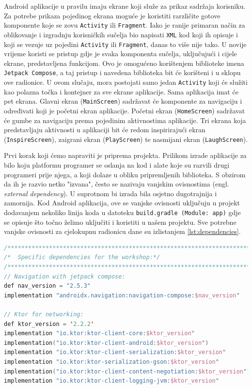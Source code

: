 \documentclass[11pt,a4paper,twoside]{article}
\begin{document}
Android aplikacije u pravilu imaju ekrane koji služe za prikaz sadržaja korisniku. Za potrebe prikaza pojedinog ekrana moguće je koristiti rarzličite gotove komponente koje se zovu \texttt{Activity} ili \texttt{Fragment}. Iako je ranije primaran način za oblikovanje i izgradnju korisničkih sučelja bio napisati \texttt{XML} kod koji ih opisuje i koji se vezuje uz pojedini \texttt{Activity} ili \texttt{Fragment}, danas to više nije tako. U novije vrijeme koristi se pristup gdje je svaka komponenta sučelja, uključujući i cijele ekrane, predstavljena funkcijom. Ovo je omogućeno korištenjem biblioteke imena \texttt{Jetpack Compose}, a taj pristup i navedena biblioteka bit će korišteni i u sklopu ove radionice. U ovom slučaju, mora postojati samo jedan \texttt{Activity} koji će služiti kao polazna točka i kontejner za sve ekrane aplikacije. Sama aplikacija imat će pet ekrana. Glavni ekran (\texttt{MainScreen}) sadržavat će komponente za navigaciju i određivati koji je početni ekran aplikacije. Početni ekran (\texttt{HomeScreen}) sadržavat će gumbe za navigaciju prema pojedinim aktivnostima aplikacije. Tri ekrana koja predstavljaju aktivnosti u aplikaciji bit će redom inspirirajući ekran (\texttt{InspireScreen}), zaigrani ekran (\texttt{PlayScreen}) te nasmijani ekran (\texttt{LaughScreen}). 

Prvi korak koji ćemo napraviti je priprema projekta. Prilikom izrade aplikacije za bilo koju platformu programer se oslanja na kod i alate koje su razvili drugi programeri prije njega, a koji dolaze u obliku pripremljenih biblioteka. S obzirom da ih je razvio netko "izvana", često se nazivaju vanjskim ovisnostima (engl. \textit{external dependency}). U suprotnom bi izrada bila osjetno dugotrajnija i zamornija. Kod Android aplikacija, ove se vanjske ovisnosti uključuju u projekt dodavanjem nekoliko linija koda u datoteku \texttt{build.gradle (Module: app)} gdje se opisuje što točno želimo uključiti i koristiti u našem projektu. Sve potrebne vanjske ovisnosti za cjelokupnu radionicu dane su izlistanjem \ref{lst:dependencies}.

\begin{lstlisting}[caption={Ovisnosnosti o vanjskim bibliotekama u datoteci build.gradle (Module:app)}, label={lst:dependencies}, language=Kotlin]
/***********************************************************************/
/*  Specific dependencies for the workshop:*/
/***********************************************************************/
// Navigation with jetpack compose:
def nav_version = "2.5.3"
implementation "androidx.navigation:navigation-compose:$nav_version"

// Ktor for networking:
def ktor_version = '2.2.2'
implementation "io.ktor:ktor-client-core:$ktor_version"
implementation("io.ktor:ktor-client-android:$ktor_version")
implementation "io.ktor:ktor-client-serialization:$ktor_version"
implementation "io.ktor:ktor-serialization-gson:$ktor_version"
implementation("io.ktor:ktor-client-content-negotiation:$ktor_version")
implementation "io.ktor:ktor-client-logging-jvm:$ktor_version"
\end{lstlisting}
\end{document}
